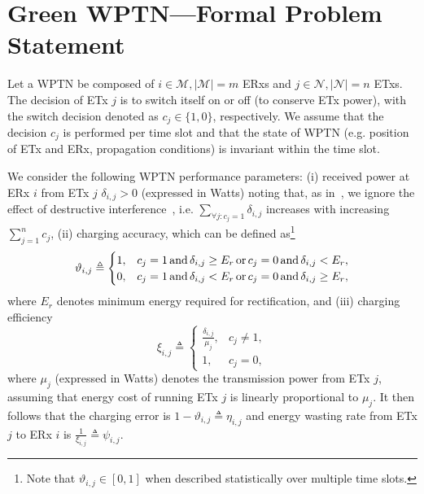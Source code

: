 \documentclass[11pt,draftclsnofoot,journal,onecolumn]{IEEEtran}
\begin{document}
\section{Green WPTN---Formal Problem Statement}
\label{sec:form_problem_statement}

Let a WPTN be composed of $i \in \mathcal{M}, |\mathcal{M}| = m$ ERxs and $j \in \mathcal{N}, |\mathcal{N}| = n$ ETxs. The decision of ETx $j$ is to switch itself on or off (to conserve ETx power), with the switch decision denoted as $c_{j} \in \{1,0\}$, respectively. We assume that the decision $c_j$ is performed per time slot and that the state of WPTN (e.g. position of ETx and ERx, propagation conditions) is invariant within the time slot.

We consider the following WPTN performance parameters: (i) received power at ERx $i$ from ETx $j$ $\delta_{i,j}>0$ (expressed in Watts) noting that, as in~\cite[Sec. III-A]{dai_infocom_2014}, we ignore the effect of destructive interference~\cite[/PDF/P2110-datasheet.pdf (p. 7)]{ti_website}, i.e. $\sum_{\forall j: c_{j}=1}\delta_{i,j}$ increases with increasing $\sum_{j=1}^{n} c_{j}$, (ii) charging accuracy, which can be defined as\footnote{Note that $\vartheta _{i,j}\in[0,1]$ when described statistically over multiple time slots.}
\begin{equation}
\vartheta _{i,j}\triangleq
\begin{cases}
1, & c_{j}=1 \text{\,and\,} \delta_{i,j}\geq E_{r} \text{\,or\,} c_{j}=0 \text{\,and\,} \delta_{i,j}<E_{r},\\
0, & c_{j}=1 \text{\,and\,} \delta_{i,j}< E_{r} \text{\,or\,} c_{j}=0 \text{\,and\,} \delta_{i,j}\geq E_{r},
\end{cases}
\label{eq:accuracy_definition}
\end{equation}
where $E_{r}$ denotes minimum energy required for rectification, and (iii) charging efficiency
\begin{equation}
\xi _{i,j}\triangleq
\begin{cases}
\frac{\delta_{i,j}}{\mu_{j}}, & c_{j}\neq 1,\\
1, & c_{j} = 0,
\end{cases}
\label{eq:efficiency_definition}
\end{equation}
where $\mu_j$ (expressed in Watts) denotes the transmission power from ETx $j$, assuming that energy cost of running ETx $j$ is linearly proportional to $\mu_j$. It then follows that the charging error is $1 - \vartheta _{i,j}\triangleq\eta _{i,j}$ and energy wasting rate from ETx $j$ to ERx $i$ is $\frac{1}{\xi _{i,j}}\triangleq\psi _{i,j}$.
\end{document}

